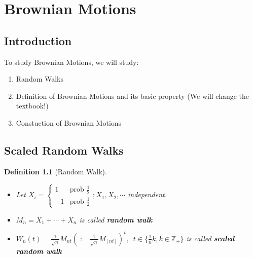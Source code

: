 \documentclass[12pt]{report}
\renewcommand{\1}{\mathbb{1}}
\theoremstyle{break}
\theoremstyle{newdef}
\newtheorem{defn}[thm]{Definition} %
\theoremstyle{remark}
\begin{document}
\chapter{Brownian Motions}
\section{Introduction}
To study Brownian Motions, we will study:
\begin{enumerate}
\item Random Walks
\item Definition of Brownian Motions and its basic property (We will change the textbook!)
\item Constuction of Brownian Motions
\end{enumerate}


\section{Scaled Random Walks}


\begin{defn}[Random Walk]
\leavevmode
\begin{itemize}
\item
Let
$
X_i = 
\begin{cases}
1 & \text{prob } \frac{1}{2}\\
-1 & \text{prob } \frac{1}{2}
\end{cases}
; X_1, X_2, \cdots
$
independent.

\item $M_n = X_1 + \cdots + X_n$ is called \textbf{random walk}

\item $W_n(t) = \frac{1}{\sqrt n} M_{nt} (:= \frac{1}{\sqrt n}M_{[nt]})^v, \enspace t \in \{ \frac{1}{n}k, k \in \mathbb{Z}_+\}$ is called \textbf{scaled random walk}
\end{itemize}
\end{defn}
\end{document}
